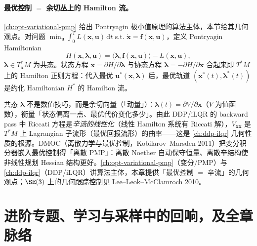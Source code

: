 \paragraph{最优控制 $=$ 余切丛上的 Hamilton 流。}
\cref{ch:opt-variational-pmp} 给出 Pontryagin 极小值原理的算法主体，本节给其几何观点。对问题 $\min_{\mathbf u}\int_0^T L(\mathbf x,\mathbf u)\,\mathrm dt$ s.t. $\dot{\mathbf x}=\mathbf f(\mathbf x,\mathbf u)$，定义 Pontryagin Hamiltonian
\begin{equation}
  H(\mathbf x,\boldsymbol\lambda,\mathbf u)=\langle\boldsymbol\lambda,\mathbf f(\mathbf x,\mathbf u)\rangle-L(\mathbf x,\mathbf u),
  \label{eq:gm-pontryagin-h}
\end{equation}
$\boldsymbol\lambda\in T^*_{\mathbf x}M$ 为共态。状态方程 $\dot{\mathbf x}=\partial H/\partial\boldsymbol\lambda$ 与协态方程 $\dot{\boldsymbol\lambda}=-\partial H/\partial\mathbf x$ 合起来即 $T^*M$ 上的 Hamilton 正则方程：代入最优 $\mathbf u^*(\mathbf x,\boldsymbol\lambda)$ 后，最优轨道 $(\mathbf x^*(t),\boldsymbol\lambda^*(t))$ 是约化 Hamiltonian $H^*$ 的 Hamilton 流。

\begin{insight}
共态 $\boldsymbol\lambda$ 不是数值技巧，而是余切向量（「动量」）：$\boldsymbol\lambda(t)=\partial V/\partial\mathbf x$（$V$ 为值函数），衡量「状态偏离一点、最优代价变化多少」。由此 DDP/iLQR 的 backward pass 中 Riccati 方程是\emph{辛流的线性化}（线性 Hamilton 系统有 Riccati 解），$V_{\mathbf{xx}}$ 是 $T^*M$ 上 Lagrangian 子流形（最优回报流形）的曲率——这是 \cref{ch:ddp-ilqr} 几何性质的根源。DMOC（离散力学与最优控制，Kobilarov--Marsden 2011\cite{kobilarov2011discrete}）把变分积分器嵌入最优控制得「离散 PMP」：离散 Noether 自动保守恒量、离散辛结构使非线性规划 Hessian 结构更好。\cref{ch:opt-variational-pmp}（变分/PMP）与 \cref{ch:ddp-ilqr}（DDP/iLQR）讲算法主体，本章提供「最优控制 $=$ 辛流」的几何观点；$\SE(3)$ 上的几何跟踪控制见 Lee--Leok--McClamroch 2010\cite{lee2010geometric}。
\end{insight}

\section{进阶专题、学习与采样中的回响，及全章脉络}
\label{sec:gm-frontier}

